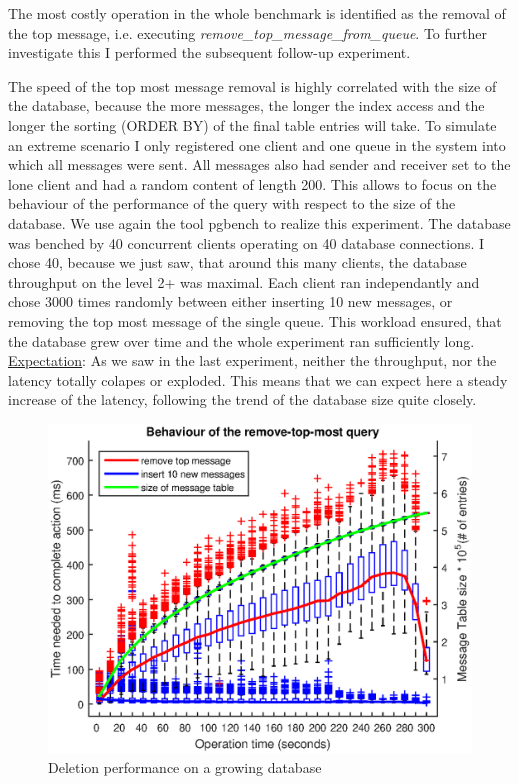 \documentclass[11pt]{article}
\begin{document}
The most costly operation in the whole benchmark is identified as the removal of the top message, i.e. executing \textit{remove\_top\_message\_from\_queue}. To further investigate this I performed the subsequent follow-up experiment.

The speed of the top most message removal is highly correlated with the size of the database, because the more messages, the longer the index access and the longer the sorting (ORDER BY) of the final table entries will take. To simulate an extreme scenario I only registered one client and one queue in the system into which all messages were sent. All messages also had sender and receiver set to the lone client and had a random content of length 200. This allows to focus on the behaviour of the performance of the query with respect to the size of the database. We use again the tool pgbench to realize this experiment. The database was benched by 40 concurrent clients operating on 40 database connections. I chose 40, because we just saw, that around this many clients, the database throughput on the level 2+ was maximal. Each client ran independantly and chose 3000 times randomly between either inserting 10 new messages, or removing the top most message of the single queue. This workload ensured, that the database grew over time and the whole experiment ran sufficiently long.
\newline\underline{Expectation}: As we saw in the last experiment, neither the throughput, nor the latency totally colapes or exploded. This means that we can expect here a steady increase of the latency, following the trend of the database size quite closely.
\begin{figure}[!htb]
\centering
\includegraphics[width=0.7\linewidth]{figures/database/data_baseline}
\caption{Deletion performance on a growing database}
\label{fig:data_baseline}
\end{figure}
\end{document}
